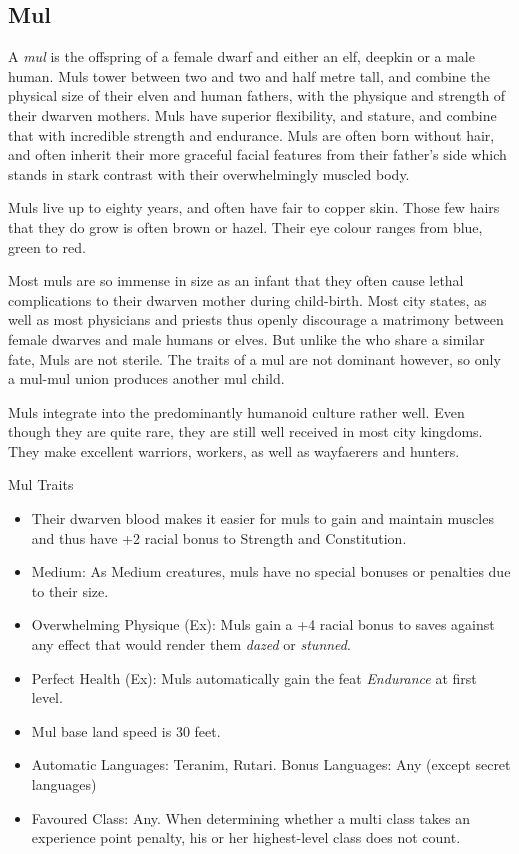 \subsection{Mul}
\label{sec:Mul}

A \emph{mul} is the offspring of a female dwarf and either an elf, deepkin or
a male human. Muls tower between two and two and half metre tall, and combine
the physical size of their elven and human fathers, with the physique and
strength of their dwarven mothers. Muls have superior flexibility, and
stature, and combine that with incredible strength and endurance.  Muls are
often born without hair, and often inherit their more graceful facial features
from their father's side which stands in stark contrast with their
overwhelmingly muscled body.

Muls live up to eighty years, and often have fair to copper skin. Those few
hairs that they do grow is often brown or hazel. Their eye colour ranges from
blue, green to red.

Most muls are so immense in size as an infant that they often cause lethal
complications to their dwarven mother during child-birth. Most city states, as
well as most physicians and priests thus openly discourage a matrimony between
female dwarves and male humans or elves. But unlike the 
who share a similar fate, Muls are not sterile. The traits of a mul are not
dominant however, so only a mul-mul union produces another mul child.

Muls integrate into the predominantly humanoid culture rather well. Even though
they are quite rare, they are still well received in most city kingdoms. They
make excellent warriors, workers, as well as wayfaerers and hunters.

\begin{35e}{Mul Traits}
  \begin{itemize}[noitemsep]
  \item Their dwarven blood makes it easier for muls to gain and maintain
    muscles and thus have +2 racial bonus to Strength and Constitution.
  \item Medium: As Medium creatures, muls have no special bonuses or penalties
    due to their size.
  \item Overwhelming Physique (Ex): Muls gain a +4 racial bonus to saves against
    any effect that would render them \emph{dazed} or \emph{stunned}.
  \item Perfect Health (Ex): Muls automatically gain the feat \emph{Endurance}
    at first level.
  \item Mul base land speed is 30 feet.
  \item Automatic Languages: Teranim, Rutari. Bonus Languages: Any (except
    secret languages)
  \item Favoured Class: Any. When determining whether a multi class takes an
    experience point penalty, his or her highest-level class does not count.
  \end{itemize}
\end{35e}
